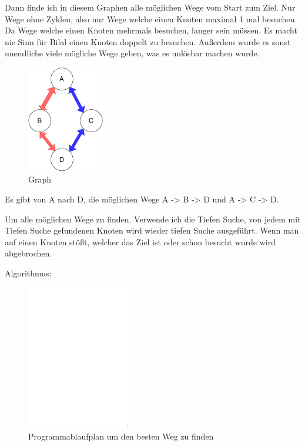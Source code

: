 \documentclass[a4paper,12pt,arial]{scrartcl}
\begin{document}
\par
Dann finde ich in diesem Graphen alle möglichen Wege vom Start zum Ziel.
Nur Wege ohne Zyklen, also nur Wege welche einen Knoten maximal 1 mal besuchen. Da Wege welche einen Knoten mehrmals besuchen, langer sein müssen.
Es macht nie Sinn für Bilal einen Knoten doppelt zu besuchen.
Außerdem wurde es sonst unendliche viele mögliche Wege geben, was es unlösbar machen wurde.

\begin{figure}
    \centering
    \includegraphics[width=0.3\textwidth]{small_example_graph.pdf}
    \caption{Graph}
    \label{fig:abbiegen}
\end{figure}
\par
Es gibt von A nach D, die möglichen Wege A -> B -> D und A -> C -> D.


\par
Um alle möglichen Wege zu finden. Verwende ich die Tiefen Suche, von jedem mit Tiefen Suche gefundenen Knoten wird wieder tiefen Suche ausgeführt.
Wenn man auf einen Knoten stößt, welcher das Ziel ist oder schon besucht wurde wird abgebrochen.
\newpage
\par
Algorithmus:
\begin{figure}[h]
    \centering
    \includegraphics[width=0.4\textwidth]{PAP_find_path.pdf}
    \caption{Programmablaufplan um den besten Weg zu finden}
    \label{fig:pap3}
\end{figure}
\end{document}
